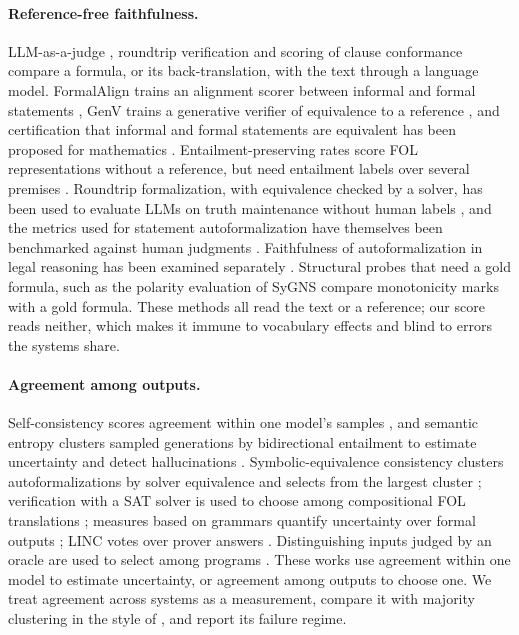 \documentclass[11pt,letterpaper]{article}
\begin{document}
\paragraph{Reference-free faithfulness.} LLM-as-a-judge \citep{Zheng2023}, roundtrip verification \citep{Amrollahi2026} and scoring of clause conformance \citep{Liu2026} compare a formula, or its back-translation, with the text through a language model. FormalAlign trains an alignment scorer between informal and formal statements \citep{Lu2024}, GenV trains a generative verifier of equivalence to a reference \citep{Singh2026}, and certification that informal and formal statements are equivalent has been proposed for mathematics \citep{Mohammad2026}. Entailment-preserving rates score FOL representations without a reference, but need entailment labels over several premises \citep{Lee2025}. Roundtrip formalization, with equivalence checked by a solver, has been used to evaluate LLMs on truth maintenance without human labels \citep{Karia2024}, and the metrics used for statement autoformalization have themselves been benchmarked against human judgments \citep{Poiroux2024}. Faithfulness of autoformalization in legal reasoning has been examined separately \citep{Wang2026}. Structural probes that need a gold formula, such as the polarity evaluation of SyGNS \citep{Yanaka2021} compare monotonicity marks with a gold formula. These methods all read the text or a reference; our score reads neither, which makes it immune to vocabulary effects and blind to errors the systems share.

\paragraph{Agreement among outputs.} Self-consistency scores agreement within one model's samples \citep{Wang2022}, and semantic entropy clusters sampled generations by bidirectional entailment to estimate uncertainty and detect hallucinations \citep{Kuhn2023,Farquhar2024}. Symbolic-equivalence consistency clusters autoformalizations by solver equivalence and selects from the largest cluster \citep{Li2024}; verification with a SAT solver is used to choose among compositional FOL translations \citep{Ryu2024}; measures based on grammars quantify uncertainty over formal outputs \citep{Ganguly2025}; LINC votes over prover answers \citep{Olausson2023}. Distinguishing inputs judged by an oracle are used to select among programs \citep{Fan2024}. These works use agreement within one model to estimate uncertainty, or agreement among outputs to choose one. We treat agreement across systems as a measurement, compare it with majority clustering in the style of \citet{Li2024}, and report its failure regime.
\end{document}
